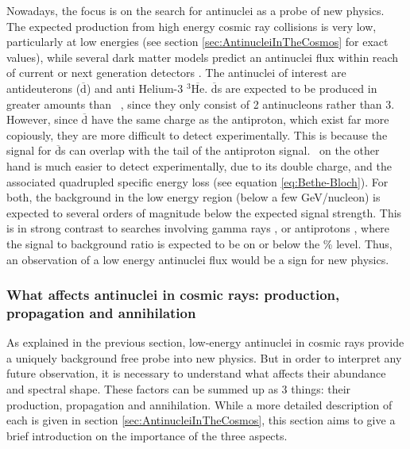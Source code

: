 Nowadays, the focus is on the search for antinuclei as a probe of new physics. The expected production from high energy cosmic ray collisions is very low, particularly at low energies (see section \ref{sec:AntinucleiInTheCosmos} for exact values), while several dark matter models predict an antinuclei flux within reach of current or next generation detectors \cite{Doetinchem_2020_review}. The antinuclei of interest are antideuterons ($\overline{\mathrm{d}}$) and anti Helium-3 $^3\overline{\mathrm{He}}$. $\overline{\mathrm{d}}$s are expected to be produced in greater amounts than \ahe\ , since they only consist of 2 antinucleons rather than 3. However, since $\overline{\mathrm{d}}$ have the same charge as the antiproton, which exist far more copiously, they are more difficult to detect experimentally. This is because the signal for $\overline{\mathrm{d}}$s can overlap with the tail of the antiproton signal. \ahe\ on the other hand is much easier to detect experimentally, due to its double charge, and the associated quadrupled specific energy loss (see equation \ref{eq:Bethe-Bloch}).
For both, the background in the low energy region (below a few GeV/nucleon) is expected to several orders of magnitude below the expected signal strength. This is in strong contrast to searches involving gamma rays \cite{Gamma_DM_searches}, or antiprotons \cite{AMS_pbar_interpretation1, AMS_pbar_systematics_discussion}, where the signal to background ratio is expected to be on or below the \% level. Thus, an observation of a low energy antinuclei flux would be a sign for new physics. 

\subsubsection{ What affects antinuclei in cosmic rays: production, propagation and annihilation}
As explained in the previous section, low-energy antinuclei in cosmic rays provide a uniquely background free probe into new physics. But in order to interpret any future observation, it is necessary to understand what affects their abundance and spectral shape. These factors can be summed up as 3 things: their production, propagation and annihilation. While a more detailed description of each is given in section \ref{sec:AntinucleiInTheCosmos}, this section aims to give a brief introduction on the importance of the three aspects. \\


